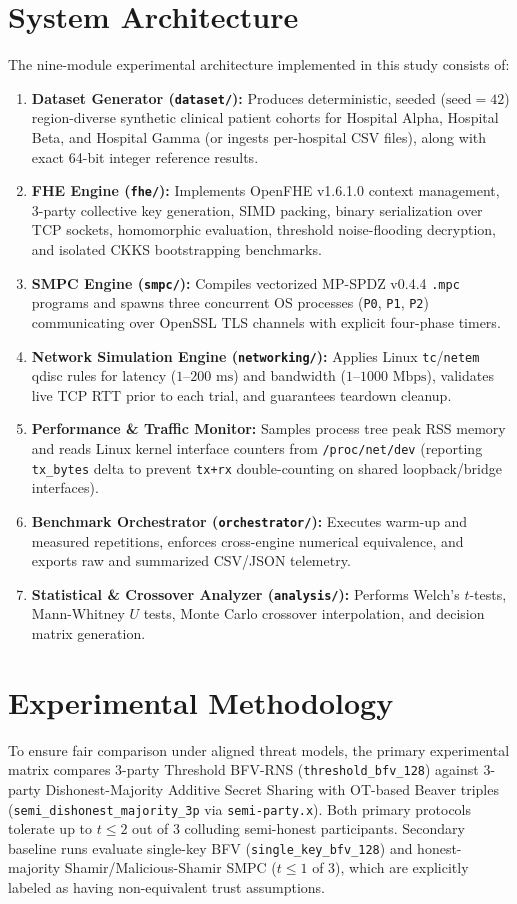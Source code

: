 \documentclass[conference]{IEEEtran}
\begin{document}
\section{System Architecture}
The nine-module experimental architecture implemented in this study consists of:
\begin{enumerate}
    \item \textbf{Dataset Generator (\texttt{dataset/}):} Produces deterministic, seeded ($\text{seed}=42$) region-diverse synthetic clinical patient cohorts for Hospital Alpha, Hospital Beta, and Hospital Gamma (or ingests per-hospital CSV files), along with exact 64-bit integer reference results.
    \item \textbf{FHE Engine (\texttt{fhe/}):} Implements OpenFHE v1.6.1.0 context management, 3-party collective key generation, SIMD packing, binary serialization over TCP sockets, homomorphic evaluation, threshold noise-flooding decryption, and isolated CKKS bootstrapping benchmarks.
    \item \textbf{SMPC Engine (\texttt{smpc/}):} Compiles vectorized MP-SPDZ v0.4.4 \texttt{.mpc} programs and spawns three concurrent OS processes (\texttt{P0}, \texttt{P1}, \texttt{P2}) communicating over OpenSSL TLS channels with explicit four-phase timers.
    \item \textbf{Network Simulation Engine (\texttt{networking/}):} Applies Linux \texttt{tc}/\texttt{netem} qdisc rules for latency ($1$--$200\text{ ms}$) and bandwidth ($1$--$1000\text{ Mbps}$), validates live TCP RTT prior to each trial, and guarantees teardown cleanup.
    \item \textbf{Performance \& Traffic Monitor:} Samples process tree peak RSS memory and reads Linux kernel interface counters from \texttt{/proc/net/dev} (reporting \texttt{tx\_bytes} delta to prevent \texttt{tx+rx} double-counting on shared loopback/bridge interfaces).
    \item \textbf{Benchmark Orchestrator (\texttt{orchestrator/}):} Executes warm-up and measured repetitions, enforces cross-engine numerical equivalence, and exports raw and summarized CSV/JSON telemetry.
    \item \textbf{Statistical \& Crossover Analyzer (\texttt{analysis/}):} Performs Welch's $t$-tests, Mann-Whitney $U$ tests, Monte Carlo crossover interpolation, and decision matrix generation.
\end{enumerate}

\section{Experimental Methodology}
To ensure fair comparison under aligned threat models, the primary experimental matrix compares 3-party Threshold BFV-RNS (\texttt{threshold\_bfv\_128}) against 3-party Dishonest-Majority Additive Secret Sharing with OT-based Beaver triples (\texttt{semi\_dishonest\_majority\_3p} via \texttt{semi-party.x}). Both primary protocols tolerate up to $t \le 2$ out of $3$ colluding semi-honest participants. Secondary baseline runs evaluate single-key BFV (\texttt{single\_key\_bfv\_128}) and honest-majority Shamir/Malicious-Shamir SMPC ($t \le 1$ of $3$), which are explicitly labeled as having non-equivalent trust assumptions.
\end{document}

